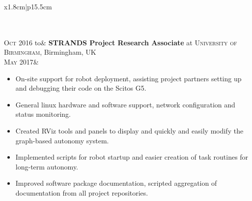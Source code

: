 \documentclass[a4paper,10pt]{article}
\newcommand{\datelen}{1.8cm}
\newcommand{\descrlen}{15.5cm}
\begin{document}
\begin{tabular}{x{\datelen}|p{\descrlen}}
{\begin{itemize}
  \end{itemize}}\\
   \\[-0.2cm]
  \textsc{Oct 2016} to& \textbf{STRANDS Project Research Associate} at \textsc{University of Birmingham}, Birmingham, UK\\
  \textsc{May 2017}&\small{
    \vspace{-0.4cm}
  \begin{itemize}
  \item On-site support for robot deployment, assisting project partners setting up and debugging their code on the Scitos G5.
  \item General linux hardware and software support, network configuration and status monitoring.
  \item Created RViz tools and panels to display and quickly and easily modify the graph-based autonomy system.
  \item Implemented scripts for robot startup and easier creation of task routines for long-term autonomy.
  \item Improved software package documentation, scripted aggregation of documentation from all project repositories.
  \vspace{-0.5cm}
  \end{itemize}}\\
   \\[-0.2cm]
  \begin{comment}
    General work on the STRANDS project codebase, improving the user-facing functionality. Mostly ROS development in Python and C++, along with bash scripting and some linux networking and system administration activities.

    Involved in the deployment of one of the STRANDS project robots in an office environment, where I helped monitor and diagnose issues with the robot and tried to ensure that the deployment achieved its research goals. I worked with researchers from the other universities involved in the project to help them get their parts of the system tested and working during the deployment.
  \end{comment}
  \begin{comment}
  \textsc{Mar} to& \textbf{Marie Skłodowska-Curie Early Stage Researcher} at \textsc{Fraunhofer IPA}, Germany\\
  \textsc{Jul 2016}&\footnotesize{PhD candidate in environment modelling and motion prediction in dynamic environments as part of the Horizon 2020 SECURE project.}\\\multicolumn{2}{c}{} \\[-0.2cm]
  \end{comment}
  \begin{comment}
    Working as a fellow of the SECURE project, part of the European Union’s Horizon 2020 research and innovation programme. In brief, the project aims to improve the safety of robots with a view to using them in environments which require interaction with humans. My responsibility was multimodal modelling and motion prediction in dynamic environments. 


\end{comment}
\end{tabular}
\end{document}

